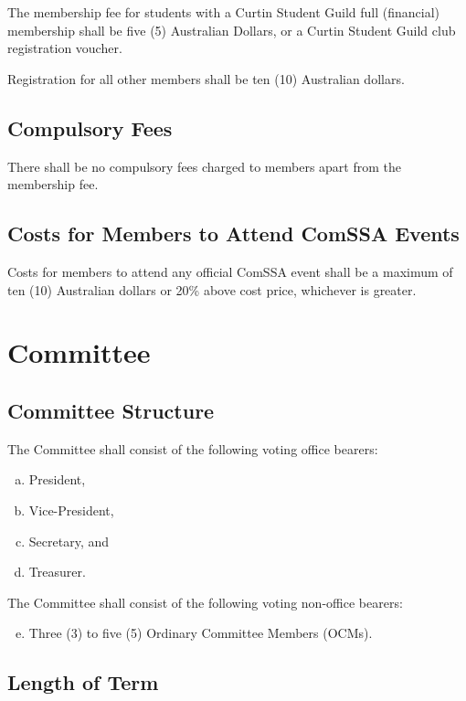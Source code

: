 \documentclass[a4paper,12pt]{article}
\begin{document}
The membership fee for students with a Curtin Student Guild full (financial) membership shall be five (5) Australian Dollars, or a Curtin Student Guild club registration voucher.

Registration for all other members shall be ten (10) Australian dollars.

\subsection{Compulsory Fees}

There shall be no compulsory fees charged to members apart from the membership fee.

\subsection{Costs for Members to Attend ComSSA Events}

Costs for members to attend any official ComSSA event shall be a maximum of ten (10) Australian dollars or 20\% above cost price, whichever is greater.

\section{Committee}

\subsection{Committee Structure}

The Committee shall consist of the following voting office bearers:

\begin{enumerate}[a)]
	\item President,
	\item Vice-President,
	\item Secretary, and
	\item Treasurer.
\end{enumerate}

The Committee shall consist of the following voting non-office bearers:

\begin{enumerate}[a)]
	\setcounter{enumi}{4}
	\item Three (3) to five (5) Ordinary Committee Members (OCMs).
\end{enumerate}

\subsection{Length of Term}
\end{document}
